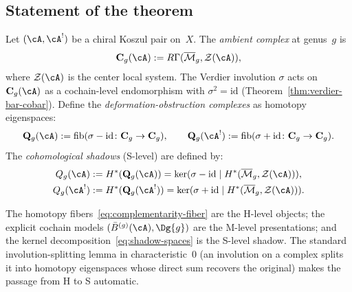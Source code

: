 \subsection{Statement of the theorem}

\begin{definition}
\label{def:complementarity-complexes}
Let $(\cA, \cA^!)$ be a chiral Koszul pair on~$X$.
The \emph{ambient complex} at genus~$g$ is
\[
\mathbf{C}_g(\cA) := R\Gamma(\overline{\mathcal{M}}_g, \mathcal{Z}(\cA)),
\]
where $\mathcal{Z}(\cA)$ is the center local system.
The Verdier involution $\sigma$ acts on $\mathbf{C}_g(\cA)$ as a
cochain-level endomorphism with $\sigma^2 = \mathrm{id}$
(Theorem~\ref{thm:verdier-bar-cobar}).
Define the \emph{deformation-obstruction complexes} as homotopy eigenspaces:
\begin{equation}\label{eq:complementarity-fiber}
\mathbf{Q}_g(\cA) := \operatorname{fib}(\sigma - \mathrm{id}\colon
\mathbf{C}_g \to \mathbf{C}_g), \qquad
\mathbf{Q}_g(\cA^!) := \operatorname{fib}(\sigma + \mathrm{id}\colon
\mathbf{C}_g \to \mathbf{C}_g).
\end{equation}
The \emph{cohomological shadows} (S-level) are defined by:
\begin{align}\label{eq:shadow-spaces}
Q_g(\cA) &:= H^*(\mathbf{Q}_g(\cA))
= \ker(\sigma - \mathrm{id} \mid H^*(\overline{\mathcal{M}}_g, \mathcal{Z}(\cA))),\\
Q_g(\cA^!) &:= H^*(\mathbf{Q}_g(\cA^!))
= \ker(\sigma + \mathrm{id} \mid H^*(\overline{\mathcal{M}}_g, \mathcal{Z}(\cA))).
\end{align}
\end{definition}

\begin{remark}
The homotopy fibers~\eqref{eq:complementarity-fiber} are the
H-level objects; the explicit cochain models
$(\bar{B}^{(g)}(\cA), \Dg{g})$ are the M-level presentations; and
the kernel decomposition~\eqref{eq:shadow-spaces} is the S-level
shadow.  The standard involution-splitting lemma in characteristic~$0$
(an involution on a complex splits it into homotopy eigenspaces whose
direct sum recovers the original) makes the passage from H to S
automatic.
\end{remark}

